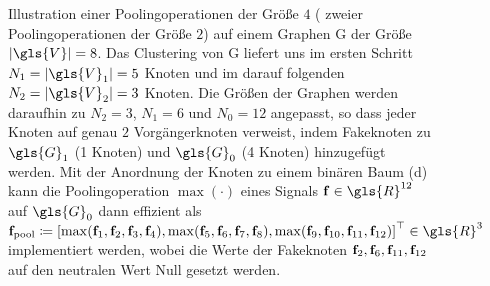 \begin{figure}[t]
{
}
\caption[Pooling auf Graphen]{Illustration einer Poolingoperationen der Größe $4$ (\bzw{} zweier Poolingoperationen der Größe $2$) auf einem Graphen \gls{G} der Größe $\left|\gls{V}\right| = 8$.
Das Clustering von \gls{G} liefert uns im ersten Schritt $N_1 =\left|\gls{V}_1\right| = 5$ Knoten und im darauf folgenden $N_2 = \left|\gls{V}_2\right| = 3$ Knoten.
Die Größen der Graphen werden daraufhin zu $N_2 = 3$, $N_1 = 6$ und $N_0 = 12$ angepasst, so dass jeder Knoten auf genau $2$ Vorgängerknoten verweist, indem Fakeknoten zu $\gls{G}_1$ (1 Knoten) und $\gls{G}_0$ (4 Knoten) hinzugefügt werden.
Mit der Anordnung der Knoten zu einem binären Baum (d) kann die Poolingoperation $\max\left(\cdot\right)$ eines Signals $\ve{f} \in \gls{R}^{12}$ auf $\gls{G}_0$ dann effizient als $\ve{f}_{\mathrm{pool}} \coloneqq {\left[ \max\left(\ve{f}_1, \ve{f}_2, \ve{f}_3, \ve{f}_4 \right), \max\left(\ve{f}_5, \ve{f}_6, \ve{f}_7, \ve{f}_8 \right), \max\left(\ve{f}_9, \ve{f}_{10}, \ve{f}_{11}, \ve{f}_{12} \right) \right]}^{\top} \in \gls{R}^3$ implementiert werden, wobei die Werte der Fakeknoten $\mathbf{f}_2, \mathbf{f}_6, \mathbf{f}_{11}, \mathbf{f}_{12}$ auf den neutralen Wert Null gesetzt werden.}
\label{fig:pooling}
\end{figure}
